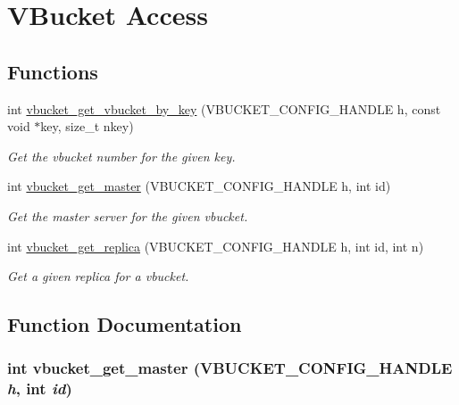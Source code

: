 \hypertarget{group__vb}{
\section{VBucket Access}
\label{group__vb}
}
\subsection*{Functions}
\begin{DoxyCompactItemize}
\item 
int \hyperlink{group__vb_ga986d488595a80170c3d768373e8a3acc}{vbucket\_\-get\_\-vbucket\_\-by\_\-key} (VBUCKET\_\-CONFIG\_\-HANDLE h, const void $\ast$key, size\_\-t nkey)
\begin{DoxyCompactList}\small\item\em Get the vbucket number for the given key. \item\end{DoxyCompactList}\item 
int \hyperlink{group__vb_ga20536a65acb417838ae8ea7aafee80d1}{vbucket\_\-get\_\-master} (VBUCKET\_\-CONFIG\_\-HANDLE h, int id)
\begin{DoxyCompactList}\small\item\em Get the master server for the given vbucket. \item\end{DoxyCompactList}\item 
int \hyperlink{group__vb_ga81e3c7d204c5b0506aaa8297eca90a63}{vbucket\_\-get\_\-replica} (VBUCKET\_\-CONFIG\_\-HANDLE h, int id, int n)
\begin{DoxyCompactList}\small\item\em Get a given replica for a vbucket. \item\end{DoxyCompactList}\end{DoxyCompactItemize}


\subsection{Function Documentation}
\hypertarget{group__vb_ga20536a65acb417838ae8ea7aafee80d1}{
\subsubsection[{vbucket\_\-get\_\-master}]{\setlength{\rightskip}{0pt plus 5cm}int vbucket\_\-get\_\-master (VBUCKET\_\-CONFIG\_\-HANDLE {\em h}, \/  int {\em id})}}
\label{group__vb_ga20536a65acb417838ae8ea7aafee80d1}


